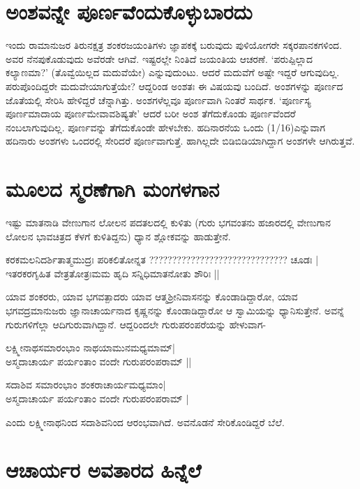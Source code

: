 \section*{ಅಂಶವನ್ನೇ ಪೂರ್ಣವೆಂದುಕೊಳ್ಳುಬಾರದು}

ಇಂದು ರಾಮಾನುಜರ ತಿರುನಕ್ಷತ್ರ ಶಂಕರಜಯಂತಿಗಳು ಜ್ಞಾಪಕಕ್ಕೆ ಬರುವುದು ಪುಳಿಯೋಗರೇ ಸಕ್ಕರಪಾನಕಗಳಿಂದ. ಅವರ ನೆನಪುಕೊಡುವುದು ಅವೆರಡೇ ಆಗಿವೆ. ಇಷ್ಟರಲ್ಲೇ ನಿಂತಿದೆ ಜಯಂತಿಯ ಆಚರಣೆ. `ಪರುಪ್ಪಿಲ್ಲಾದ ಕಲ್ಯಾಣಮಾ?' (ತೊವ್ವೆಯಿಲ್ಲದ ಮದುವೆಯೇ) ಎನ್ನುವುದುಂಟು. ಆದರೆ ಮದುವೆಗೆ ಅಷ್ಟೇ ಇದ್ದರೆ ಆಗುವುದಿಲ್ಲ. ಪರುಪೊಂದಿದ್ದರೇ ಮದುವೇಯಾಗುತ್ತೆಯೇ? ಆದ್ದರಿಂಡ ಅಂಶತಃ ಈ ವಿಷಯವು ಬಂದಿದೆ. ಅಂಶಗಳನ್ನು  ಪೂರ್ಣದ ಜೊತೆಯಲ್ಲಿ ಸೇರಿಸಿ ಹೇಳಿದ್ದರೆ ಚೆನ್ನಾಗಿತ್ತು. ಅಂಶಗಳೆಲ್ಲವೂ ಪೂರ್ಣವಾಗಿ ನಿಂತರೆ ಸಾರ್ಥಕ. `ಪೂರ್ಣಸ್ಯ ಪೂರ್ಣಮಾದಾಯ ಪೂರ್ಣಮೇವಾವಶಿಷ್ಯತೇ' ಆದರೆ ಬರೀ ಅಂಶ ತೆಗೆದುಕೊಂಡು ಪೂರ್ಣವೆಂದರೆ ನಂಬಲಾಗುವುದಿಲ್ಲ. ಪೂರ್ಣವನ್ನು ತೆಗೆದುಕೊಂಡೇ ಹೇಳಬೇಕು. ಹದಿನಾರನೆಯ ಒಂದು (1/16)ಎನ್ನುವಾಗ ಹದಿನಾರು ಅಂಶಗಳು ಒಂದರಲ್ಲಿ ಸೇರಿದರೆ ಪೂರ್ಣವಾಗುತ್ತೆ. ಹಾಗಿಲ್ಲದೇ ಬಿಡಿಬಿಡಿಯಾಗಿದ್ದಾಗ ಅಂಶಗಳೇ ಆಗಿರುತ್ತವೆ.

\section*{ಮೂಲದ ಸ್ಮರಣೆಗಾಗಿ ಮಂಗಳಗಾನ}

ಇಷ್ಟು ಮಾತನಾಡಿ ವೇಣುಗಾನ ಲೋಲನ ಪದತಲದಲ್ಲಿ ಕುಳಿತು (ಗುರು ಭಗವಂತನು ಹಜಾರದಲ್ಲಿ ವೇಣುಗಾನ ಲೋಲನ ಭಾವಚಿತ್ರದ ಕೆಳಗೆ ಕುಳಿತಿದ್ದನು) ಧ್ಯಾನ ಶ್ಲೋಕವನ್ನು ಹಾಡುತ್ತೇನೆ.

\begin{shloka}
ಕರಕಮಲನಿದರ್ಶಿತಾತ್ಮಮುದ್ರಃ ಪರಿಕಲಿತೋನ್ನತ  ?????????????????????????????? ಚೂಡಃ |\\%
ಇತರಕರಗೃಹಿತ ವೇತ್ರತೋತ್ರಃಮಮ ಹೃದಿ ಸನ್ನಿಧಿಮಾತನೋತು ಶೌರಿಃ ||
\end{shloka}

ಯಾವ ಶಂಕರರು, ಯಾವ ಭಗವತ್ಪಾದರು ಯಾವ ಆತ್ಮಶ್ರೀನಿವಾಸನನ್ನು ಕೊಂಡಾಡಿದ್ದಾರೋ, ಯಾವ ಭಗವದ್ರಮಾನುಜರು ಜ್ಞಾನಾಚಾರ್ಯನಾದ ಕೃಷ್ಣನನ್ನು ಕೊಂಡಾಡಿದ್ದಾರೋ ಆ ಸ್ವಾಮಿಯನ್ನು ಧ್ಯಾನಿಸುತ್ತೇನೆ. ಅವನ್ನೆ ಗುರುಗಳಿಗೆಲ್ಲಾ ಆದಿಗುರುವಾಗಿದ್ದಾನೆ. ಆದ್ದರಿಂದಲೇ ಗುರುಪರಂಪರೆಯನ್ನು ಹೇಳುವಾಗ-

\begin{shloka}
ಲಕ್ಷ್ಮೀನಾಥಸಮಾರಂಭಾಂ ನಾಥಯಾಮುನಮಧ್ಯಮಾಮ್|\\
ಅಸ್ಮದಾಚಾರ್ಯ ಪರ್ಯಂತಾಂ ವಂದೇ ಗುರುಪರಂಪರಾಮ್ ||
\end{shloka}

\begin{shloka}
ಸದಾಶಿವ ಸಮಾರಂಭಾಂ ಶಂಕರಾಚಾರ್ಯಮಧ್ಯಮಾಂ|\\
ಅಸ್ಮದಾಚಾರ್ಯ ಪರ್ಯಂತಾಂ ವಂದೇ ಗುರುಪರಂಪರಾಮ್ |
\end{shloka}
ಎಂದು ಲಕ್ಷ್ಮೀನಾಥನಿಂದ ಸದಾಶಿವನಿಂದ ಆರಂಭವಾಗಿದೆ. ಅವನೊಡನೆ ಸೇರಿಕೊಂಡಿದ್ದರೆ ಬೆಲೆ.

\section*{ಆಚಾರ್ಯರ ಅವತಾರದ ಹಿನ್ನೆಲೆ}

